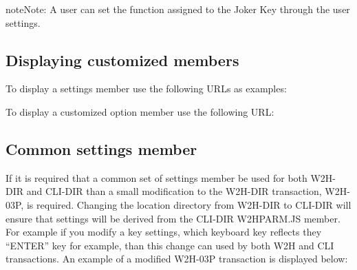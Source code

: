 \documentclass[letterpaper,10pt,english]{sphinxmanual}
\begin{document}
\begin{sphinxadmonition}{note}{Note:}
A user can set the function assigned to the Joker Key through the user settings.
\end{sphinxadmonition}


\ignorespaces 

\subsection{Displaying customized members}
\label{\detokenize{Customization:displaying-customized-members}}\label{\detokenize{Customization:index-2}}
To display a settings member use the following URLs as examples:

\begin{sphinxVerbatim}[commandchars=\\\{\}]
\end{sphinxVerbatim}


To display a customized option member use the following URL:

\begin{sphinxVerbatim}[commandchars=\\\{\}]
\end{sphinxVerbatim}


\ignorespaces 

\subsection{Common settings member}
\label{\detokenize{Customization:common-settings-member}}\label{\detokenize{Customization:index-3}}
If it is required that a common set of settings member be used for both W2H-DIR and CLI-DIR than a small modification to the W2H-DIR transaction, W2H-03P, is required. Changing the location directory from W2H-DIR to CLI-DIR will ensure that settings will be derived from the CLI-DIR W2HPARM.JS member. For example if you modify a key settings, which keyboard key reflects they “ENTER” key for example, than this change can used by both W2H and CLI transactions. An example of a modified W2H-03P transaction is displayed below:
\end{document}
